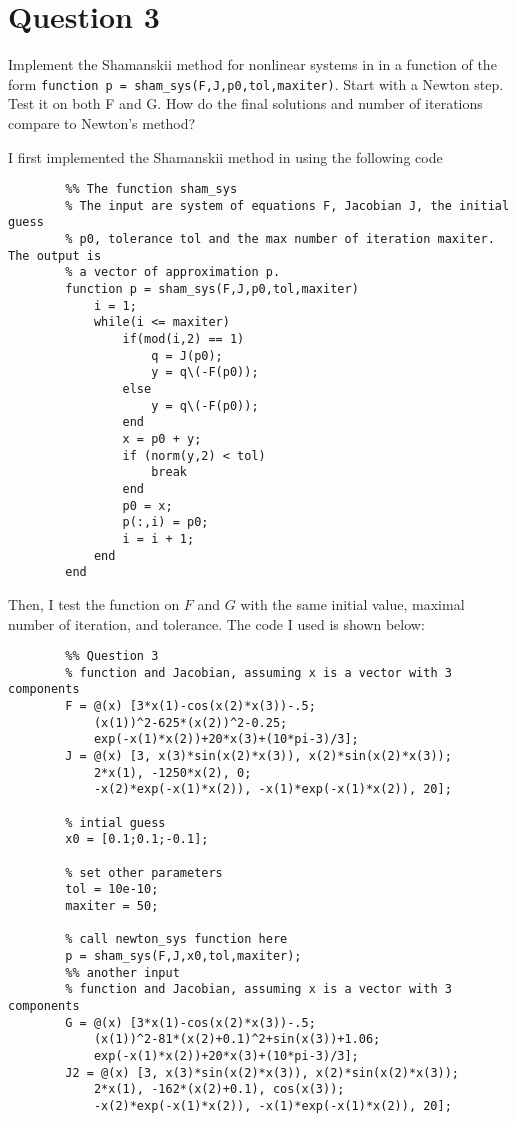 \section{Question 3}

\begin{question}
    Implement the Shamanskii method for nonlinear systems in \MATLAB in a function of the form \verb+function p = sham_sys(F,J,p0,tol,maxiter)+. Start with a Newton step. Test it on both F and G. How do the final solutions and number of iterations compare to Newton’s method?
\end{question}

\begin{answer}
    I first implemented the Shamanskii method in \MATLAB using the following code
    \begin{verbatim}
        %% The function sham_sys
        % The input are system of equations F, Jacobian J, the initial guess 
        % p0, tolerance tol and the max number of iteration maxiter. The output is
        % a vector of approximation p.
        function p = sham_sys(F,J,p0,tol,maxiter)
            i = 1;
            while(i <= maxiter)
                if(mod(i,2) == 1)
                    q = J(p0);
                    y = q\(-F(p0));
                else
                    y = q\(-F(p0));
                end
                x = p0 + y;
                if (norm(y,2) < tol)
                    break
                end
                p0 = x;
                p(:,i) = p0;
                i = i + 1;
            end
        end
    \end{verbatim}
    Then, I test the function on $F$ and $G$ with the same initial value, maximal number of iteration, and tolerance. The code I used is shown below:
    \begin{verbatim}
        %% Question 3
        % function and Jacobian, assuming x is a vector with 3 components
        F = @(x) [3*x(1)-cos(x(2)*x(3))-.5;
            (x(1))^2-625*(x(2))^2-0.25;
            exp(-x(1)*x(2))+20*x(3)+(10*pi-3)/3];
        J = @(x) [3, x(3)*sin(x(2)*x(3)), x(2)*sin(x(2)*x(3));
            2*x(1), -1250*x(2), 0;
            -x(2)*exp(-x(1)*x(2)), -x(1)*exp(-x(1)*x(2)), 20];
        
        % intial guess
        x0 = [0.1;0.1;-0.1];
        
        % set other parameters
        tol = 10e-10;
        maxiter = 50;
        
        % call newton_sys function here
        p = sham_sys(F,J,x0,tol,maxiter);
        %% another input
        % function and Jacobian, assuming x is a vector with 3 components
        G = @(x) [3*x(1)-cos(x(2)*x(3))-.5;
            (x(1))^2-81*(x(2)+0.1)^2+sin(x(3))+1.06;
            exp(-x(1)*x(2))+20*x(3)+(10*pi-3)/3];
        J2 = @(x) [3, x(3)*sin(x(2)*x(3)), x(2)*sin(x(2)*x(3));
            2*x(1), -162*(x(2)+0.1), cos(x(3));
            -x(2)*exp(-x(1)*x(2)), -x(1)*exp(-x(1)*x(2)), 20];
        

\end{verbatim}
\end{answer}
